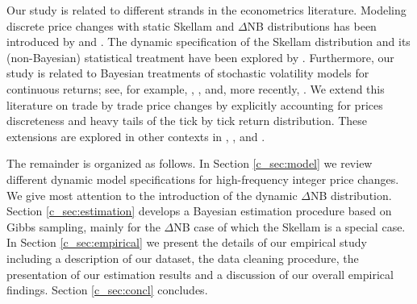 \documentclass[12pt]{article}
\begin{document}








Our study is related to different strands in the econometrics literature.
Modeling discrete price changes with static Skellam and
$\Delta$NB distributions has been introduced by \citet{AlzaidOmair2010}
and \citet{BNPollardShephard2012}.
The dynamic specification of the Skellam distribution
and its (non-Bayesian) statistical treatment have been
explored by \citet{KoopmanLucasLit2014}.
Furthermore, our study is related to Bayesian treatments of
stochastic volatility models for continuous returns; see, for example,
\citet{ChibNardariShephard2002},
\citet{KimShephardChib1998},
\citet{OmoriChibShephardNakajima2007} and, more recently,
\citet{JohannesStroud2014}.
We extend this literature on trade by trade price changes
by explicitly accounting for prices discreteness and
heavy tails of the tick by tick return distribution.
These extensions are explored in other contexts in
\citet{Engle2000}, \citet{CzadoHaug2010},
\citet{DahlhausNeddermeyer2014} and \citet{RydbergShephard2003}.

The remainder is organized as follows.
In Section \ref{c_sec:model} we review different dynamic model
specifications for high-frequency integer price changes.
We give most attention to the
introduction of the dynamic $\Delta$NB distribution.
Section \ref{c_sec:estimation} develops a Bayesian estimation procedure
based on Gibbs sampling, mainly for the $\Delta$NB case of which the
Skellam is a special case.
In Section \ref{c_sec:empirical} we present the details of our
empirical study including a description of our dataset,
the data cleaning procedure, the presentation of our estimation
results and a discussion of our overall empirical findings.
Section \ref{c_sec:concl} concludes.
\end{document}
